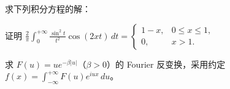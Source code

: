 \newpage
\noindent\begin{minipage}{\textwidth}
求下列积分方程的解：
\end{minipage}\par\vfill
\noindent\begin{minipage}{\textwidth}
证明 $\displaystyle\frac2\pi\int_0^{+\infty}\frac{\sin^2t}{t^2}\cos(2xt)\,dt=\begin{cases}1-x,&0\le x\le1,\\0,&x>1.\end{cases}$
\end{minipage}\par\vfill
\noindent\begin{minipage}{\textwidth}
求 $F(u)=ue^{-\beta|u|}$（$\beta>0$）的 Fourier 反变换，采用约定 $\displaystyle f(x)=\int_{-\infty}^{+\infty}F(u)e^{iux}\,du$。
\end{minipage}\par\vfill
